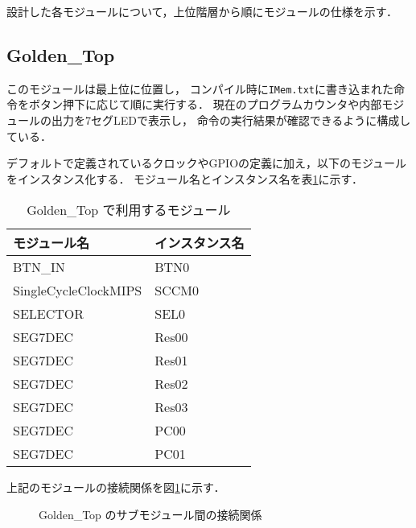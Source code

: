 
設計した各モジュールについて，上位階層から順にモジュールの仕様を示す．

\subsection{Golden\_Top}
このモジュールは最上位に位置し，
コンパイル時に\texttt{IMem.txt}に書き込まれた命令をボタン押下に応じて順に実行する．
現在のプログラムカウンタや内部モジュールの出力を7セグLEDで表示し，
命令の実行結果が確認できるように構成している．

デフォルトで定義されているクロックやGPIOの定義に加え，以下のモジュールをインスタンス化する．
モジュール名とインスタンス名を表\ref{tab:golden_top_mod}に示す．
\begin{table}[h]
  \centering
  \caption{Golden\_Top で利用するモジュール}
  \begin{tabular}{l|l}
    モジュール名 & インスタンス名 \\
    \hline
    BTN\_IN & BTN0 \\
    SingleCycleClockMIPS & SCCM0 \\
    SELECTOR & SEL0 \\
    SEG7DEC & Res00 \\
    SEG7DEC & Res01 \\
    SEG7DEC & Res02 \\
    SEG7DEC & Res03 \\
    SEG7DEC & PC00 \\
    SEG7DEC & PC01
  \end{tabular}
  \label{tab:golden_top_mod}
\end{table}
上記のモジュールの接続関係を図\ref{fig:golden_top_block}に示す．
\begin{figure}[h]
  \centerning
  \caption{Golden\_Top のサブモジュール間の接続関係}
  \label{fig:golden_top_block}
\end{figure}

